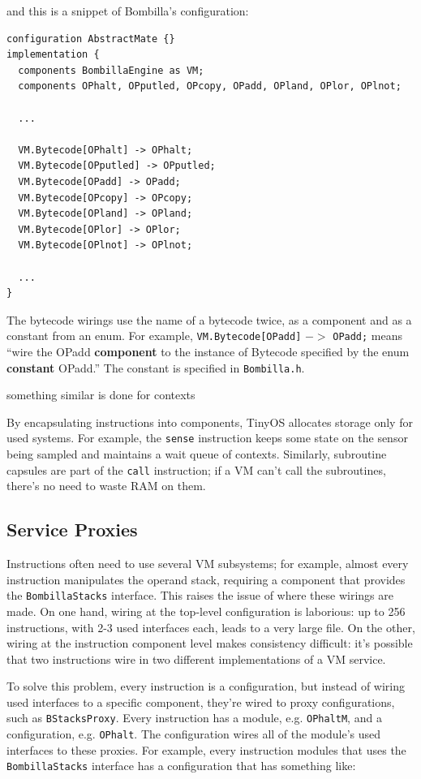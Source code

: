 \documentclass[10pt]{article}
\newcommand{\bomb}{Bombilla\xspace}
\begin{document}
and this is a snippet of \bomb's configuration:

\begin{verbatim}
configuration AbstractMate {}
implementation {
  components BombillaEngine as VM;
  components OPhalt, OPputled, OPcopy, OPadd, OPland, OPlor, OPlnot;

  ...

  VM.Bytecode[OPhalt] -> OPhalt;
  VM.Bytecode[OPputled] -> OPputled;
  VM.Bytecode[OPadd] -> OPadd;
  VM.Bytecode[OPcopy] -> OPcopy;
  VM.Bytecode[OPland] -> OPland;
  VM.Bytecode[OPlor] -> OPlor;
  VM.Bytecode[OPlnot] -> OPlnot;

  ...
}
\end{verbatim}

The bytecode wirings use the name of a bytecode twice, as a component
and as a constant from an enum. For example, {\tt VM.Bytecode[OPadd]}
$->$ {\tt OPadd;} means ``wire the OPadd {\bf component} to the
instance of Bytecode specified by the enum {\bf constant} OPadd.'' The
constant is specified in {\tt Bombilla.h}.

{\Large something similar is done for contexts}

By encapsulating instructions into components, TinyOS allocates
storage only for used systems. For example, the {\tt sense}
instruction keeps some state on the sensor being sampled and maintains
a wait queue of contexts. Similarly, subroutine capsules are part of
the {\tt call} instruction; if a VM can't call the subroutines,
there's no need to waste RAM on them.

\subsection{Service Proxies}

Instructions often need to use several VM subsystems; for example,
almost every instruction manipulates the operand stack, requiring a
component that provides the {\tt BombillaStacks} interface. This
raises the issue of where these wirings are made. On one hand, wiring
at the top-level configuration is laborious: up to 256 instructions,
with 2-3 used interfaces each, leads to a very large file. On the
other, wiring at the instruction component level makes consistency
difficult: it's possible that two instructions wire in two different
implementations of a VM service.

To solve this problem, every instruction is a configuration, but
instead of wiring used interfaces to a specific component, they're
wired to proxy configurations, such as {\tt BStacksProxy}. Every
instruction has a module, e.g. {\tt OPhaltM}, and a configuration,
e.g. {\tt OPhalt}. The configuration wires all of the module's used
interfaces to these proxies. For example, every instruction modules
that uses the {\tt BombillaStacks} interface has a configuration that
has something like:
\end{document}
